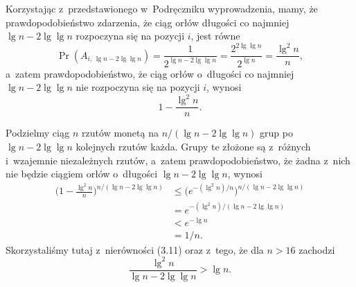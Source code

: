 \exercise %

\noindent Korzystając z~przedstawionego w~Podręczniku wyprowadzenia, mamy, że prawdopodobieństwo zdarzenia, że ciąg orłów długości co najmniej $\lg n-2\lg\lg n$ rozpoczyna się na pozycji $i$, jest równe
\[
	\Pr(A_{i,\,\lg n-2\lg\lg n}) = \frac{1}{2^{\lg n-2\lg\lg n}} = \frac{2^{2\lg\lg n}}{2^{\lg n}} = \frac{\lg^2n}{n},
\]
a~zatem prawdopodobieństwo, że ciąg orłów o~długości co najmniej $\lg n-2\lg\lg n$ nie rozpoczyna się na pozycji $i$, wynosi
\[
	1-\frac{\lg^2n}{n}.
\]

Podzielmy ciąg $n$ rzutów monetą na $n/(\lg n-2\lg\lg n)$ grup po $\lg n-2\lg\lg n$ kolejnych rzutów każda.
Grupy te złożone są z~różnych i~wzajemnie niezależnych rzutów, a~zatem prawdopodobieństwo, że żadna z~nich nie będzie ciągiem orłów o~długości $\lg n-2\lg\lg n$, wynosi
\begin{align*}
	\biggl(1-\frac{\lg^2n}{n}\biggr)^{n/(\lg n-2\lg\lg n)} &\le \bigl(e^{-(\lg^2n)/n}\bigr)^{n/(\lg n-2\lg\lg n)} \\
	&= e^{-(\lg^2n)/(\lg n-2\lg\lg n)} \\
	&< e^{-\lg n} \\
	&= 1/n.
\end{align*}
Skorzystaliśmy tutaj z~nierówności (3.11) oraz z~tego, że dla $n>16$ zachodzi
\[
	\frac{\lg^2n}{\lg n-2\lg\lg n} > \lg n.
\]
